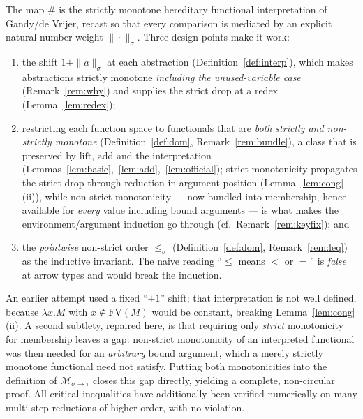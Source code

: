 \documentclass{amsart}
\theoremstyle{definition}
\newcommand{\FV}{\mathrm{FV}}
\begin{document}
The map $\#$ is the strictly monotone hereditary functional interpretation of
Gandy/de Vrijer, recast so that every comparison is mediated by an explicit natural-number
weight $\|\cdot\|_\sigma$. Three design points make it work:
\begin{enumerate}
\item the shift $1+\|a\|_\sigma$ at each abstraction (Definition~\ref{def:interp}), which
  makes abstractions strictly monotone \emph{including the unused-variable case}
  (Remark~\ref{rem:why}) and supplies the strict drop at a redex (Lemma~\ref{lem:redex});
\item restricting each function space to functionals that are \emph{both strictly and
  non-strictly monotone} (Definition~\ref{def:dom}, Remark~\ref{rem:bundle}), a class that
  is preserved by $\mathrm{lift}$, $\mathrm{add}$ and the interpretation
  (Lemmas~\ref{lem:basic},~\ref{lem:add},~\ref{lem:official}); strict monotonicity
  propagates the strict drop through reduction in argument position
  (Lemma~\ref{lem:cong}(ii)), while non-strict monotonicity --- now bundled into
  membership, hence available for \emph{every} value including bound arguments --- is what
  makes the environment/argument induction go through (cf.\ Remark~\ref{rem:keyfix}); and
\item the \emph{pointwise} non-strict order $\le_\sigma$ (Definition~\ref{def:dom},
  Remark~\ref{rem:leq}) as the inductive invariant. The naive reading ``$\le$ means $<$ or
  $=$'' is \emph{false} at arrow types and would break the induction.
\end{enumerate}
An earlier attempt used a fixed ``$+1$'' shift; that interpretation is not well defined,
because $\lambda x.M$ with $x\notin\FV(M)$ would be constant, breaking
Lemma~\ref{lem:cong}(ii). A second subtlety, repaired here, is that requiring only
\emph{strict} monotonicity for membership leaves a gap: non-strict monotonicity of an
interpreted functional was then needed for an \emph{arbitrary} bound argument, which a
merely strictly monotone functional need not satisfy. Putting both monotonicities into the
definition of $\mathcal M_{\sigma\to\tau}$ closes this gap directly, yielding a complete,
non-circular proof. All critical inequalities have additionally been verified numerically on
many multi-step reductions of higher order, with no violation.
\end{document}
